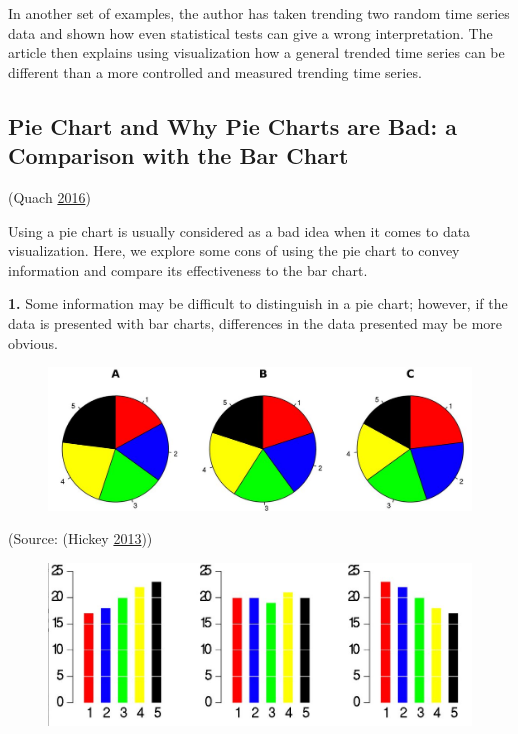 \documentclass[]{book}
\theoremstyle{definition}
\theoremstyle{definition}
\theoremstyle{definition}
\theoremstyle{remark}
\begin{document}
In another set of examples, the author has taken trending two random
time series data and shown how even statistical tests can give a wrong
interpretation. The article then explains using visualization how a
general trended time series can be different than a more controlled and
measured trending time series.

\subsection{Pie Chart and Why Pie Charts are Bad: a Comparison with the
Bar
Chart}\label{pie-chart-and-why-pie-charts-are-bad-a-comparison-with-the-bar-chart}

(Quach \protect\hyperlink{ref-quach-penny}{2016})

Using a pie chart is usually considered as a bad idea when it comes to
data visualization. Here, we explore some cons of using the pie chart to
convey information and compare its effectiveness to the bar chart.

\textbf{1.} Some information may be difficult to distinguish in a pie
chart; however, if the data is presented with bar charts, differences in
the data presented may be more obvious.

\begin{figure}
\centering
\includegraphics{images/hickey-before.jpg}
\caption{}
\end{figure}

(Source: (Hickey \protect\hyperlink{ref-hickey-pie-worst}{2013}))

\begin{figure}
\centering
\includegraphics{images/hickey-after.jpg}
\caption{}
\end{figure}
\end{document}
